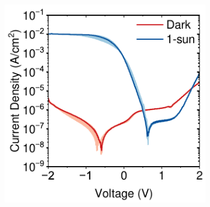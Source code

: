 \begin{figure}[ht!]
\begin{subfigure}{0.4\textwidth}
        \includegraphics[width=\textwidth]{chapters/transport_layers/images/AP40_4_JV.pdf}
        \caption{}
        \label{}
    \end{subfigure}
    
    \vspace{0.5em} %
    

\end{figure}
